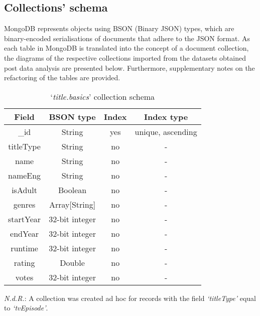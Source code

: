 \subsection{Collections' schema}

MongoDB represents objects using BSON (Binary JSON) types, which are binary-encoded serialisations of documents that adhere to the JSON format.
As each table in MongoDB is translated into the concept of a document collection, the diagrams of the respective collections imported from the datasets obtained post data analysis are presented below.
Furthermore, supplementary notes on the refactoring of the tables are provided.

\begin{table}[H]
	\caption{`\textit{title.basics}' collection schema}
\begin{center}
	\begin{tabular}{ cccc }
		\hline
		Field & BSON type & Index & Index type \\
		\hline
		\_id & String & yes & unique, ascending \\
		titleType & String & no & - \\
		name & String & no & - \\
		nameEng & String & no & - \\
		isAdult & Boolean & no & - \\
		genres & Array[String] & no & - \\
		startYear & 32-bit integer & no & - \\
		endYear & 32-bit integer & no & - \\
		runtime & 32-bit integer & no & - \\
		rating & Double & no & - \\
		votes & 32-bit integer & no & - \\
		\hline
	\end{tabular}
\end{center}
\end{table}  

\textit{N.d.R.}: A collection was created ad hoc for records with the field \textit{`titleType'} equal to \textit{`tvEpisode'}.

